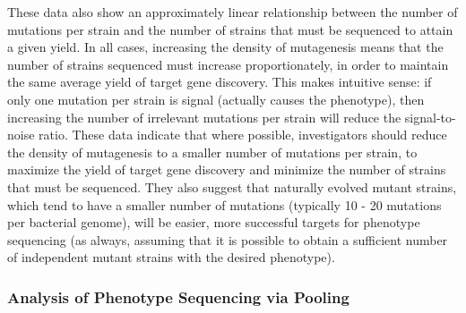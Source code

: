 \documentclass[letterpaper,10pt,english]{howto}
\begin{document}
These data also show an approximately linear relationship between
the number of mutations per strain and the number of strains
that must be sequenced to attain a given yield.  In all cases,
increasing the density of mutagenesis means that the
number of strains sequenced must increase proportionately,
in order to maintain the same average yield of target gene
discovery.  This makes intuitive sense: if only one mutation
per strain is signal (actually causes the phenotype), then
increasing the number of irrelevant mutations per strain
will reduce the signal-to-noise ratio.
These data indicate that where possible, investigators should
reduce the density of mutagenesis to a smaller number of
mutations per strain, to maximize the yield of target gene
discovery and minimize the number of strains that must be
sequenced.  They also suggest that naturally evolved mutant strains,
which tend to have a smaller number of mutations
(typically 10 - 20 mutations per bacterial genome), will be
easier, more successful targets for phenotype sequencing
(as always, assuming that it is possible to obtain a
sufficient number of independent mutant strains with the
desired phenotype).


\subsubsection{Analysis of Phenotype Sequencing via Pooling}
\end{document}
